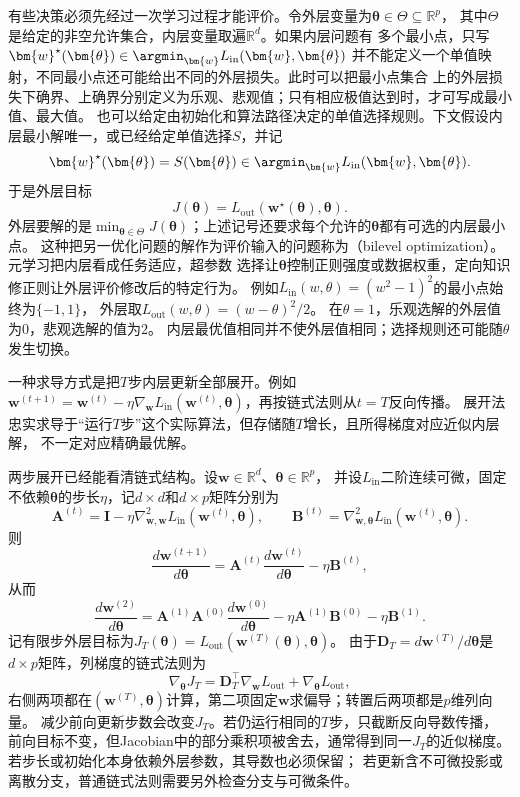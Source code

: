 有些决策必须先经过一次学习过程才能评价。令外层变量为$\bm\theta\in\Theta\subseteq\mathbb R^p$，
其中$\Theta$是给定的非空允许集合，内层变量取遍$\mathbb R^d$。如果内层问题有
多个最小点，只写
$\bm{w}^{\star}(\bm{\theta})\in
\argmin_{\bm{w}}L_{\mathrm{in}}(\bm{w},\bm{\theta})$
并不能定义一个单值映射，不同最小点还可能给出不同的外层损失。此时可以把最小点集合
上的外层损失下确界、上确界分别定义为乐观、悲观值；只有相应极值达到时，才可写成最小值、最大值。
也可以给定由初始化和算法路径决定的单值选择规则。下文假设内层最小解唯一，或已经给定单值选择$S$，并记
\[
  \bm{w}^{\star}(\bm{\theta})=S(\bm{\theta})
  \in\argmin_{\bm{w}}L_{\mathrm{in}}(\bm{w},\bm{\theta}).
\]
于是外层目标
\begin{equation}
  J(\bm{\theta})
  =L_{\mathrm{out}}(\bm{w}^{\star}(\bm{\theta}),\bm{\theta}).
  \label{eq:opt-bilevel-objective}
\end{equation}
外层要解的是$\min_{\bm\theta\in\Theta}J(\bm\theta)$；上述记号还要求每个允许的$\bm\theta$都有可选的内层最小点。
这种把另一优化问题的解作为评价输入的问题称为（bilevel optimization）。元学习把内层看成任务适应，超参数
选择让$\bm{\theta}$控制正则强度或数据权重，定向知识修正则让外层评价修改后的特定行为。
例如$L_{\mathrm{in}}(w,\theta)=(w^2-1)^2$的最小点始终为$\{-1,1\}$，
外层取$L_{\mathrm{out}}(w,\theta)=(w-\theta)^2/2$。
在$\theta=1$，乐观选解的外层值为$0$，悲观选解的值为$2$。
内层最优值相同并不使外层值相同；选择规则还可能随$\theta$发生切换。

一种求导方式是把$T$步内层更新全部展开。例如
$\bm{w}^{(t+1)}=\bm{w}^{(t)}-\eta\nabla_{\bm{w}}
L_{\mathrm{in}}(\bm{w}^{(t)},\bm{\theta})$，再按链式法则从$t=T$反向传播。
展开法忠实求导于“运行$T$步”这个实际算法，但存储随$T$增长，且所得梯度对应近似内层解，
不一定对应精确最优解。

两步展开已经能看清链式结构。设$\bm w\in\mathbb R^d$、$\bm\theta\in\mathbb R^p$，
并设$L_{\mathrm{in}}$二阶连续可微，固定不依赖$\bm\theta$的步长$\eta$，记$d\times d$和$d\times p$矩阵分别为
\[
  \bm{A}^{(t)}=\bm{I}-\eta\nabla_{\bm{w},\bm{w}}^2
  L_{\mathrm{in}}(\bm{w}^{(t)},\bm{\theta}),\qquad
  \bm{B}^{(t)}=\nabla_{\bm{w},\bm{\theta}}^2
  L_{\mathrm{in}}(\bm{w}^{(t)},\bm{\theta}).
\]
则
\[
  \frac{d\bm{w}^{(t+1)}}{d\bm{\theta}}
  =\bm{A}^{(t)}\frac{d\bm{w}^{(t)}}{d\bm{\theta}}-\eta\bm{B}^{(t)},
\]
从而
\[
  \frac{d\bm{w}^{(2)}}{d\bm{\theta}}
  =\bm{A}^{(1)}\bm{A}^{(0)}\frac{d\bm{w}^{(0)}}{d\bm{\theta}}
  -\eta\bm{A}^{(1)}\bm{B}^{(0)}-\eta\bm{B}^{(1)}.
\]
记有限步外层目标为$J_T(\bm\theta)=L_{\mathrm{out}}(\bm w^{(T)}(\bm\theta),\bm\theta)$。
由于$\bm D_T=d\bm w^{(T)}/d\bm\theta$是$d\times p$矩阵，列梯度的链式法则为
\[
 \nabla_{\bm\theta}J_T
 =\bm D_T^\top\nabla_{\bm w}L_{\mathrm{out}}
  +\nabla_{\bm\theta}L_{\mathrm{out}},
\]
右侧两项都在$(\bm w^{(T)},\bm\theta)$计算，第二项固定$\bm w$求偏导；转置后两项都是$p$维列向量。
减少前向更新步数会改变$J_T$。若仍运行相同的$T$步，只截断反向导数传播，
前向目标不变，但Jacobian中的部分乘积项被舍去，通常得到同一$J_T$的近似梯度。
若步长或初始化本身依赖外层参数，其导数也必须保留；
若更新含不可微投影或离散分支，普通链式法则需要另外检查分支与可微条件。

